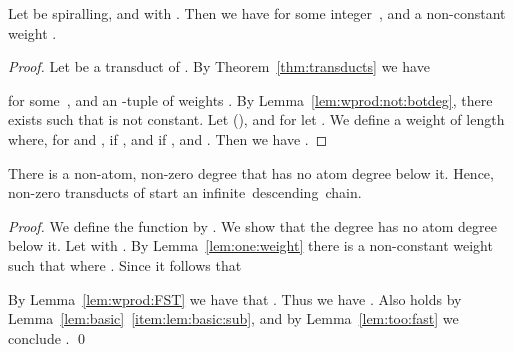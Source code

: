 \begin{lemma}\label{lem:one:weight}
  Let  be spiralling, and  with .
  Then we have 
  for some integer~, and a non-constant weight .
\end{lemma}
\begin{proof}Let  be a transduct of . 
  By Theorem~\ref{thm:transducts} we have
  
  for some~, and an -tuple of weights .
  By Lemma~\ref{lem:wprod:not:botdeg}, there exists  
  such that  is not constant.
Let  (), 
  and for  let .
  We define a weight  of length  where, for  and ,
   if , and  if , 
  and .
  Then we have
  .
\end{proof}

\begin{theorem}\label{thm:no:minimal:below}
  There is a non-atom, non-zero degree  that has no atom degree below it.
  Hence, non-zero transducts of  start an infinite~descending~chain. \end{theorem}

\begin{proof}
  We define the function  by .
  We show that the degree  has no atom degree below it.
  Let  with . 
  By Lemma~\ref{lem:one:weight} there is a non-constant weight 
  such that  where 
  .
Since  it follows that 
  
  By Lemma~\ref{lem:wprod:FST} we have that .
  Thus we have .
  Also 
  holds by Lemma~\ref{lem:basic}~\ref{item:lem:basic:sub},
  and by Lemma~\ref{lem:too:fast} we conclude .
  \qed
\end{proof}